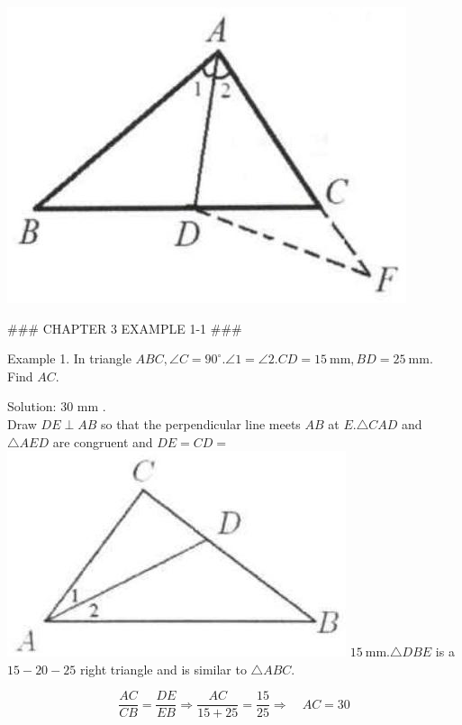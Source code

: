 \documentclass[10pt]{article}
\begin{document}
\includegraphics[max width=\textwidth, center]{2025_04_17_97bc1f7e44d93c271a88g-054(2)}


### CHAPTER 3 EXAMPLE 1-1 ###

Example 1. In triangle \(A B C, \angle C=90^{\circ} . \angle 1=\angle 2 . C D=15 \mathrm{~mm}, B D=25 \mathrm{~mm}\). Find \(A C\).

Solution: 30 mm .\\
Draw \(D E \perp A B\) so that the perpendicular line meets \(A B\) at \(E . \triangle C A D\) and \(\triangle A E D\) are congruent and \(D E=C D=\)\\
\includegraphics[max width=\textwidth]{2025_04_17_97bc1f7e44d93c271a88g-055} \(15 \mathrm{~mm} . \triangle D B E\) is a \(15-20-25\) right triangle and is similar to \(\triangle A B C\).

\[
\frac{A C}{C B}=\frac{D E}{E B} \Rightarrow \frac{A C}{15+25}=\frac{15}{25} \Rightarrow \quad A C=30
\]
\end{document}

